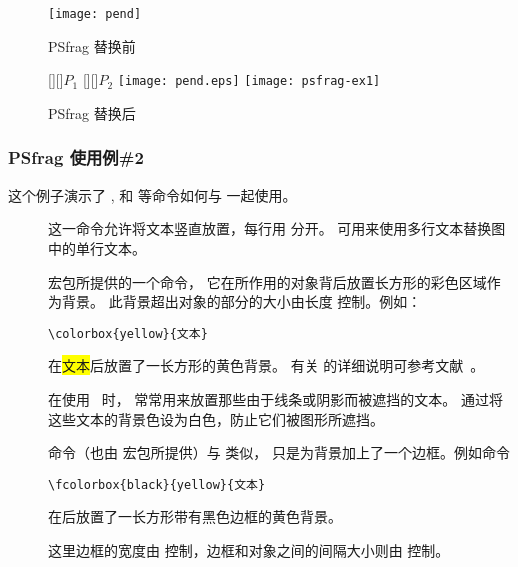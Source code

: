 \begin{figure}
\begin{minipage}[t]{.5\textwidth}
\vspace{0pt}
\centering
\texttt{[image: pend]}
\caption{PSfrag 替换前}\label{fig:nopsfrag}
\end{minipage}%
\begin{minipage}[t]{.5\textwidth}
\vspace{0pt}
\centering
\ifdvips
{}
[][]{$P_1$}
[][]{\large $P_2$}
\texttt{[image: pend.eps]}
\else
\texttt{[image: psfrag-ex1]}
\fi
\caption{PSfrag 替换后}\label{fig:psfragex1}
\end{minipage}
\end{figure}

\subsubsection{PSfrag 使用例\#2}\label{sssec:psfragex2}

这个例子演示了 ,  和  等命令如何与  一起使用。

\begin{description}
\item[] 这一命令允许将文本竖直放置，每行用 \cmd{\cmd{}} 分开。
	可用来使用多行文本替换图中的单行文本。
\item[]  宏包所提供的一个命令，
	它在所作用的对象背后放置长方形的彩色区域作为背景。
	此背景超出对象的部分的大小由长度  控制。例如：
\begin{lstlisting}
\colorbox{yellow}{文本}
\end{lstlisting}
	在{\colorbox{yellow}{文本}}后放置了一长方形的黄色背景。
	有关  的详细说明可参考文献~\cite{grfguide}。

	在使用 ~时， 常常用来放置那些由于线条或阴影而被遮挡的文本。
	通过将这些文本的背景色设为白色，防止它们被图形所遮挡。
\item[] 命令（也由  宏包所提供）与  类似，
	只是为背景加上了一个边框。例如命令
\begin{Verbatim}
\fcolorbox{black}{yellow}{文本}
\end{Verbatim}
	在{}后放置了一长方形带有黑色边框的黄色背景。

	这里边框的宽度由  控制，边框和对象之间的间隔大小则由  控制。
\end{description}


